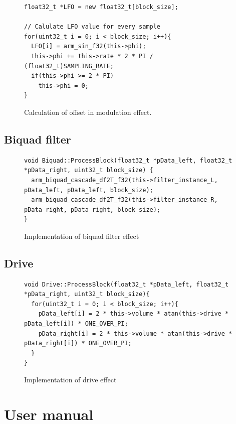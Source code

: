 \documentclass[a4paper,twoside,12pt]{book}
\begin{document}
\begin{figure}[H]
\centering
\begin{lstlisting}
float32_t *LFO = new float32_t[block_size];

// Calulate LFO value for every sample
for(uint32_t i = 0; i < block_size; i++){
  LFO[i] = arm_sin_f32(this->phi);
  this->phi += this->rate * 2 * PI / (float32_t)SAMPLING_RATE;
  if(this->phi >= 2 * PI)
    this->phi = 0;
}
\end{lstlisting}
\caption{Calculation of offset in modulation effect.}
\label{fig:modul}
\end{figure}

\subsection{Biquad filter}
\begin{figure}[H]
\centering
\begin{lstlisting}
void Biquad::ProcessBlock(float32_t *pData_left, float32_t *pData_right, uint32_t block_size) {
  arm_biquad_cascade_df2T_f32(this->filter_instance_L, pData_left, pData_left, block_size);
  arm_biquad_cascade_df2T_f32(this->filter_instance_R, pData_right, pData_right, block_size);
}
\end{lstlisting}
\caption{Implementation of biquad filter effect}
\label{fig:Biq}
\end{figure}

\subsection{Drive}
\begin{figure}[H]
\centering
\begin{lstlisting}
void Drive::ProcessBlock(float32_t *pData_left, float32_t *pData_right, uint32_t block_size){
  for(uint32_t i = 0; i < block_size; i++){
    pData_left[i] = 2 * this->volume * atan(this->drive * pData_left[i]) * ONE_OVER_PI;
    pData_right[i] = 2 * this->volume * atan(this->drive * pData_right[i]) * ONE_OVER_PI;
  }
}
\end{lstlisting}
\caption{Implementation of drive effect}
\label{fig:Drv}
\end{figure}


\section{User manual}
\end{document}
